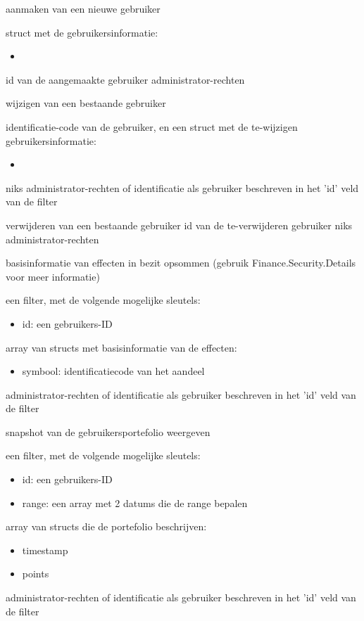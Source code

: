 	{ aanmaken van een nieuwe gebruiker }
	{ struct met de gebruikersinformatie:
		\begin{itemize}
		\item{}
		\end{itemize} }
	{ id van de aangemaakte gebruiker }
	{ administrator-rechten }

	{ wijzigen van een bestaande gebruiker }
	{ identificatie-code van de gebruiker, en een struct met de te-wijzigen gebruikersinformatie:
		\begin{itemize}
		\item{}
		\end{itemize} }
	{ niks }
	{ administrator-rechten of identificatie als gebruiker beschreven in het 'id' veld van de filter }

	{ verwijderen van een bestaande gebruiker }
	{ id van de te-verwijderen gebruiker }
	{ niks }
	{ administrator-rechten }

	{ basisinformatie van effecten in bezit opsommen (gebruik Finance.Security.Details voor meer informatie) }
	{ een filter, met de volgende mogelijke sleutels:
		\begin{itemize}
		\item{id: een gebruikers-ID}
		\end{itemize} }
	{ array van structs met basisinformatie van de effecten:
		\begin{itemize}
		\item{symbool: identificatiecode van het aandeel}
		\end{itemize} }
	{ administrator-rechten of identificatie als gebruiker beschreven in het 'id' veld van de filter }

	{ snapshot van de gebruikersportefolio weergeven }
	{ een filter, met de volgende mogelijke sleutels:
		\begin{itemize}
		\item{id: een gebruikers-ID}
		\item{range: een array met 2 datums die de range bepalen}
		\end{itemize} }
	{ array van structs die de portefolio beschrijven:
		\begin{itemize}
		\item{timestamp}
		\item{points}
		\end{itemize} }
	{ administrator-rechten of identificatie als gebruiker beschreven in het 'id' veld van de filter }

